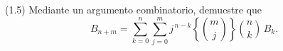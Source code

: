 
(1.5) Mediante un argumento combinatorio, demuestre que
\[
  B_{n+m} = \sum_{k=0}^{n}\sum_{j=0}^{m} j^{\,n-k}
  \left\{\binom{m}{j}\right\}\binom{n}{k} \, B_k.
\]

